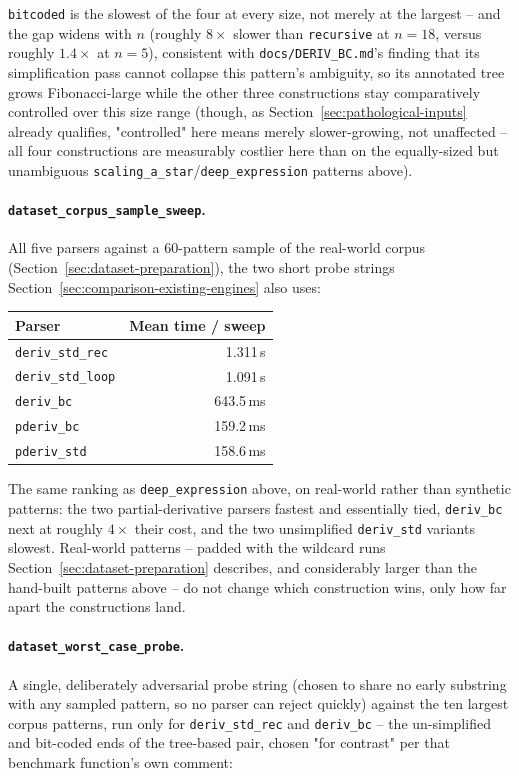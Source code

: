 \texttt{bitcoded} is the slowest of the four at every size, not merely
at the largest -- and the gap widens with $n$ (roughly $8\times$ slower
than \texttt{recursive} at $n{=}18$, versus roughly $1.4\times$ at
$n{=}5$), consistent with \texttt{docs/DERIV\_BC.md}'s finding that its
simplification pass cannot collapse this pattern's ambiguity, so its
annotated tree grows Fibonacci-large while the other three constructions
stay comparatively controlled over this size range (though, as
Section~\ref{sec:pathological-inputs} already qualifies, "controlled"
here means merely slower-growing, not unaffected -- all four constructions
are measurably costlier here than on the equally-sized but unambiguous
\texttt{scaling\_a\_star}/\texttt{deep\_expression} patterns above).

\paragraph{\texttt{dataset\_corpus\_sample\_sweep}.} All five parsers
against a $60$-pattern sample of the real-world corpus
(Section~\ref{sec:dataset-preparation}), the two short probe strings
Section~\ref{sec:comparison-existing-engines} also uses:

\begin{center}
\begin{tabular}{lr}
\hline
Parser & Mean time / sweep \\
\hline
\texttt{deriv\_std\_rec} & 1.311\,s \\
\texttt{deriv\_std\_loop} & 1.091\,s \\
\texttt{deriv\_bc} & 643.5\,ms \\
\texttt{pderiv\_bc} & 159.2\,ms \\
\texttt{pderiv\_std} & 158.6\,ms \\
\hline
\end{tabular}
\end{center}

The same ranking as \texttt{deep\_expression} above, on real-world rather
than synthetic patterns: the two partial-derivative parsers fastest and
essentially tied, \texttt{deriv\_bc} next at roughly $4\times$ their
cost, and the two unsimplified \texttt{deriv\_std} variants slowest.
Real-world patterns -- padded with the wildcard runs
Section~\ref{sec:dataset-preparation} describes, and considerably larger
than the hand-built patterns above -- do not change which construction
wins, only how far apart the constructions land.

\paragraph{\texttt{dataset\_worst\_case\_probe}.} A single, deliberately
adversarial probe string (chosen to share no early substring with any
sampled pattern, so no parser can reject quickly) against the ten
largest corpus patterns, run only for \texttt{deriv\_std\_rec} and
\texttt{deriv\_bc} -- the un-simplified and bit-coded ends of the
tree-based pair, chosen "for contrast" per that benchmark function's own
comment:

